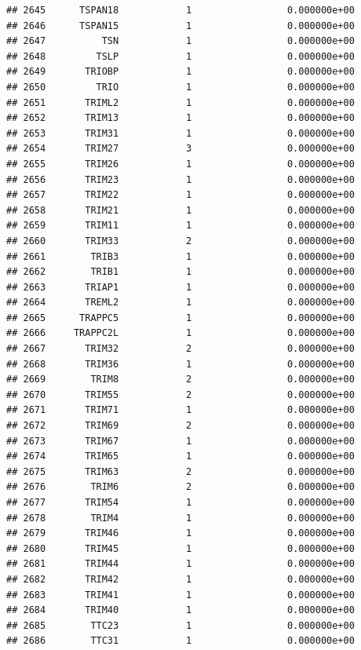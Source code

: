 \documentclass[
]{article}
\begin{document}
\begin{verbatim}
## 2645      TSPAN18            1                 0.000000e+00
## 2646      TSPAN15            1                 0.000000e+00
## 2647          TSN            1                 0.000000e+00
## 2648         TSLP            1                 0.000000e+00
## 2649       TRIOBP            1                 0.000000e+00
## 2650         TRIO            1                 0.000000e+00
## 2651       TRIML2            1                 0.000000e+00
## 2652       TRIM13            1                 0.000000e+00
## 2653       TRIM31            1                 0.000000e+00
## 2654       TRIM27            3                 0.000000e+00
## 2655       TRIM26            1                 0.000000e+00
## 2656       TRIM23            1                 0.000000e+00
## 2657       TRIM22            1                 0.000000e+00
## 2658       TRIM21            1                 0.000000e+00
## 2659       TRIM11            1                 0.000000e+00
## 2660       TRIM33            2                 0.000000e+00
## 2661        TRIB3            1                 0.000000e+00
## 2662        TRIB1            1                 0.000000e+00
## 2663       TRIAP1            1                 0.000000e+00
## 2664       TREML2            1                 0.000000e+00
## 2665      TRAPPC5            1                 0.000000e+00
## 2666     TRAPPC2L            1                 0.000000e+00
## 2667       TRIM32            2                 0.000000e+00
## 2668       TRIM36            1                 0.000000e+00
## 2669        TRIM8            2                 0.000000e+00
## 2670       TRIM55            2                 0.000000e+00
## 2671       TRIM71            1                 0.000000e+00
## 2672       TRIM69            2                 0.000000e+00
## 2673       TRIM67            1                 0.000000e+00
## 2674       TRIM65            1                 0.000000e+00
## 2675       TRIM63            2                 0.000000e+00
## 2676        TRIM6            2                 0.000000e+00
## 2677       TRIM54            1                 0.000000e+00
## 2678        TRIM4            1                 0.000000e+00
## 2679       TRIM46            1                 0.000000e+00
## 2680       TRIM45            1                 0.000000e+00
## 2681       TRIM44            1                 0.000000e+00
## 2682       TRIM42            1                 0.000000e+00
## 2683       TRIM41            1                 0.000000e+00
## 2684       TRIM40            1                 0.000000e+00
## 2685        TTC23            1                 0.000000e+00
## 2686        TTC31            1                 0.000000e+00

\end{verbatim}
\end{document}
